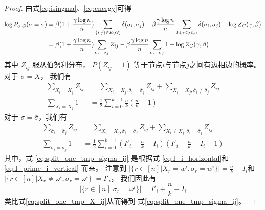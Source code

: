 \begin{proof}
  由式\eqref{eq:isingma}、\eqref{eq:energy}可得
	\begin{align}
  \log P_{\sigma|G}(\sigma=\bar{\sigma})
  & = 
  \beta(1 + \frac{\gamma \log n}{n}) \sum_{\{i,j\} \in E(G)}  \delta(\bar{\sigma}_i, \bar{\sigma}_j)  
	- \beta\frac{\gamma \log n}{n} \sum_{1\leq i<j \leq n} \delta(\bar{\sigma}_i, \bar{\sigma}_j)  - \log Z_G(\gamma, \beta)
  \notag\\
  & = 
  \beta(1 + \frac{\gamma \log n}{n}) \sum_{\bar{\sigma}_i = \bar{\sigma}_j} Z_{ij}
	- \beta\frac{\gamma \log n}{n}
  \sum_{\bar{\sigma}_i = \bar{\sigma}_j} 1 
  - \log Z_G(\gamma, \beta)
  \label{eq:log_P_sigma_G_bar_sigma}
  \end{align}
	其中 $Z_{ij}$ 服从伯努利分布，
  $P(Z_{ij}=1)$ 等于节点$i$与节点$j$之间有边相边的概率。
	对于 $\sigma = X$， 我们有
	\begin{align}
	\sum_{X_i = X_j} Z_{ij} &
  = \sum_{X_i = X_j, \bar{\sigma}_i = \bar{\sigma}_j}
  Z_{ij} + \sum_{X_i = X_j, \bar{\sigma}_i \neq \bar{\sigma}_j}
  Z_{ij}
  \label{eq:split_zij_tmp_X_ij}\\
	\sum_{X_i = X_j} 1 &= \frac{1}{2} \sum_{i=0}^{k-1} \frac{n}{k} 
  \left( \frac{n}{k} - 1 
  \right)\label{eq:split_one_tmp_X_ij}
	\end{align}
	对于 $\sigma = \bar{\sigma}$，我们有
	\begin{align}
	\sum_{\bar{\sigma}_i = \bar{\sigma}_j} Z_{ij} &= \sum_{X_i = X_j, \bar{\sigma}_i = \bar{\sigma}_j} Z_{ij} + \sum_{X_i \neq X_j, \bar{\sigma}_i = \bar{\sigma}_j} Z_{ij} 
  \label{eq:split_zij_tmp_sigma_ij}\\
	\sum_{\bar{\sigma}_i = \bar{\sigma}_j} 1 &= \frac{1}{2} \sum_{i=0}^{k-1} (I'_i + \frac{n}{k} - I_i) ( I'_i + \frac{n}{k} - I_i - 1)
  \label{eq:split_one_tmp_sigma_ij}
	\end{align}
  其中，式 \eqref{eq:split_one_tmp_sigma_ij} 是根据式
  \eqref{eq:I_i_horizontal}和 \eqref{eq:I_prime_i_vertical}
  而来。
	注意到
  $
  \Big|\{r\in [n] \big| X_r = w^i, \sigma_r=w^i \}\Big|
  =\frac{n}{k} - I_i$和
	$|\{r\in [n] | X_r \neq \omega^i, \sigma_r = \omega^i \}| = I'_i$，
	我们因此有  
  \begin{equation}\label{eq:number_of_sigma_r_equal_omega_i}
    |\{r\in [n] | \sigma_r = \omega^i \}|
    = I'_i + \frac{n}{k} - I_i
  \end{equation}
  类比式\eqref{eq:split_one_tmp_X_ij}从而得到
  式\eqref{eq:split_one_tmp_sigma_ij}。


\end{proof}
